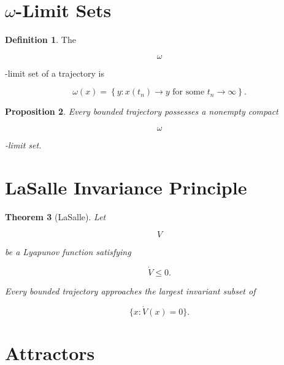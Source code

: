\documentclass[11pt]{book}
\numberwithin{equation}{chapter}
\theoremstyle{definition}
\newtheorem{definition}{Definition}[chapter]
\theoremstyle{plain}
\newtheorem{theorem}[definition]{Theorem}
\newtheorem{proposition}[definition]{Proposition}
\begin{document}

\section{$\omega$-Limit Sets}

\begin{definition}

The

\[
\omega
\]

-limit set of a trajectory is

\[
\omega(x)
=
\left\{
y
:
x(t_n)
\rightarrow
y
\text{ for some }
t_n\rightarrow\infty
\right\}.
\]

\end{definition}


\begin{proposition}

Every bounded trajectory possesses a nonempty compact

\[
\omega
\]

-limit set.

\end{proposition}


\section{LaSalle Invariance Principle}

\begin{theorem}[LaSalle]

Let

\[
V
\]

be a Lyapunov function satisfying

\[
\dot V\le0.
\]

Every bounded trajectory approaches the largest invariant subset of

\[
\{
x:
\dot V(x)=0
\}.
\]

\end{theorem}


\section{Attractors}
\end{document}
